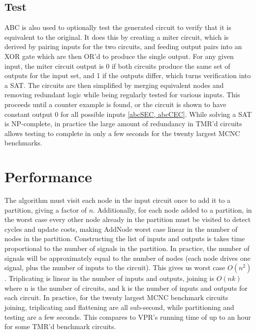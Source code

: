 \documentclass[12pt,final,oneside]{dwThesis} %
\begin{document}
   \subsection{Test}\label{algTest} \gls{ABC} is also used to optionally test
   the generated circuit to verify that it is equivalent to the original. It
   does this by creating a miter circuit, which is derived by pairing inputs
   for the two circuits, and feeding output pairs into an XOR gate which are
   then OR'd to produce the single output. For any given input, the miter
   circuit output is 0 if both circuits produce the same set of outputs for the
   input set, and 1 if the outputs differ, which turns verification into a
   \gls{SAT}.  The circuits are then simplified by merging equivalent nodes and
   removing redundant logic while being regularly tested for various inputs.
   This proceeds until a counter example is found, or the circuit is shown to
   have constant output 0 for all possible inputs \ref{abcSEC, abcCEC}.  While
   solving a \gls{SAT} is NP-complete, in practice the large amount of
   redundancy in \gls{TMR}'d circuits allows testing to complete in only a few
   seconds for the twenty largest \gls{MCNC} benchmarks.

   \section{Performance} The algorithm must visit each node in the input
   circuit once to add it to a partition, giving a factor of $n$.
   Additionally, for each node added to a partition, in the worst case every
   other node already in the partition must be visited to detect cycles and
   update costs, making AddNode worst case linear in the number of nodes in the
   partition.  Constructing the list of inputs and outputs is takes time
   proportional to the number of signals in the partition. In practice, the
   number of signals will be approximately equal to the number of nodes (each
   node drives one signal, plus the number of inputs to the circuit).  This
   gives us worst case $O(n^2)$.  Triplicating is linear in the number of
   inputs and outputs, joining is $O(nk)$ where n is the number of circuits,
   and k is the number of inputs and outputs for each circuit.  In practice, for the twenty
   largest \gls{MCNC} benchmark circuits joining, triplicating and flattening
   are all sub-second, while partitioning and testing are a few seconds. This
   compares to \gls{VPR}'s running time of up to an hour for some \gls{TMR}'d
   benchmark circuits.  
   
\end{document}
